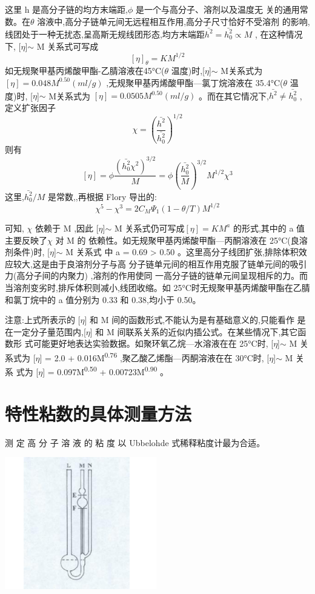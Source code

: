 \documentclass[11pt]{report}
\begin{document}
这里 h 是高分子链的均方末端距,\(\phi\) 是一个与高分子、溶剂以及温度无
关的通用常数。在\(\theta\) 溶液中,高分子链单元间无远程相互作用,高分子尺寸恰好不受溶剂
的影响,线团处于一种无扰态,呈高斯无规线团形态,均方末端距\(\bar{h^{2}}=\bar{h_{0}^{2}}\propto M\) ,
在这种情况下, [\(\eta\)]\(\sim\) M 关系式可写成
\[
[\eta]_{\theta}=KM^{1/2}
\]
如无规聚甲基丙烯酸甲酯-乙腈溶液在45°C(\(\theta\) 温度)时,[\(\eta\)]\(\sim\) M关系式为
\([\eta]=0.048M^{0.50} (ml/g)\) ,无规聚甲基丙烯酸甲酯—氯丁烷溶液在 35.4°C(\(\theta\) 温度)时,
[\(\eta\)]\(\sim\) M关系式为 \([\eta]=0.0505M^{0.50}(ml/g)\) 。而在其它情况下,\(\bar{h^{2}}\neq \bar{h_{0}^{2}}\) ,
定义扩张因子
\[
\chi =\left(\frac{\bar{h^{2}}}{\bar{h_{0}^{2}}}\right)^{1/2}
\]
则有
\[
[\eta]=\phi \frac{\left(\bar{h_{0}^{2}}\chi^{2}\right)^{3/2}}{M}=\phi \left(\frac{\bar{h_{0}^{2}}}{M}\right)^{3/2}M^{1/2}\chi^{3}
\]
这里,\(\bar{h_{0}^{2}}/M\) 是常数,,再根据 Flory 导出的:
\[
\chi^{5}-\chi^{3}=2C_{M}\Psi_{1}(1-\theta/T)M^{1/2}
\]

可知, \(\chi\) 依赖于 M ,因此 [\(\eta\)]\(\sim\) M 关系式仍可写成\([\eta]=KM^{a}\) 的形式,其中的 a 值主要反映了\(\chi\) 对 M 的
依赖性。如无规聚甲基丙烯酸甲酯—丙酮溶液在 25°C(良溶剂条件)时, [\(\eta\)]\(\sim\) M 关系式
中 a = 0.69 > 0.50 。这里高分子线团扩张,排除体积效应较大,这是由于良溶剂分子与高
分子链单元间的相互作用克服了链单元间的吸引力(高分子间的内聚力)
 ,溶剂的作用使同
一高分子链的链单元间呈现相斥的力。而当溶剂变劣时,排斥体积则减小,线团收缩。如
25°C时无规聚甲基丙烯酸甲酯在乙腈和氯丁烷中的 a 值分别为 0.33 和 0.38,均小于 0.50。

注意:上式所表示的 [\(\eta\)] 和 M 间的函数形式,不能认为是有基础意义的,只能看作
是在一定分子量范围内,[\(\eta\)] 和 M 间联系关系的近似内插公式。在某些情况下,其它函数形
式可能更好地表达实验数据。如聚环氧乙烷—水溶液在在 25°C时, [\(\eta\)]\(\sim\) M 关系式为
[\(\eta\)] = 2.0 + 0.016M\textsuperscript{0.76} ,聚乙酸乙烯酯—丙酮溶液在在 30°C时, [\(\eta\)]\(\sim\) M 关系
式为
[\(\eta\)] = 0.097M\textsuperscript{0.50} + 0.00723M\textsuperscript{0.90} 。

\chapter{特性粘数的具体测量方法}
\label{sec:orgd507b88}
测 定 高 分 子 溶 液 的 粘 度 以
Ubbelohde 式稀释粘度计最为合适。
\begin{center}
\includegraphics[width=250]{../img/4.png}
\end{center}
\end{document}
